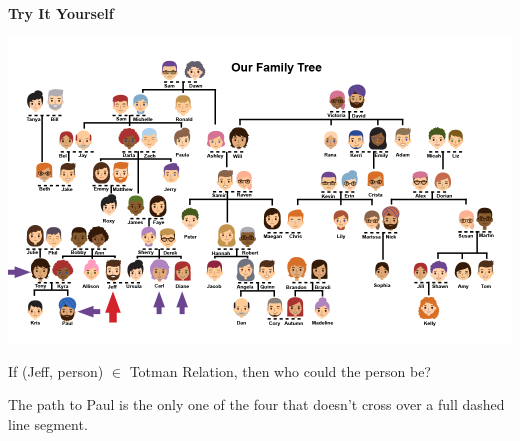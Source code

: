 \documentclass{ximera}
\begin{document}
\begin{example}
\quad \\
\textbf{Try It Yourself}

\begin{image}
\includegraphics{pics/Jeff_arrow.png}
\end{image}

If (Jeff, person) $\in$ Totman Relation, then who could the person be?
\begin{multipleChoice}
\end{multipleChoice}
\begin{feedback}
The path to Paul is the only one of the four that doesn't cross over a full dashed line segment.
\end{feedback}


\end{example}
\quad \\
\end{document}
